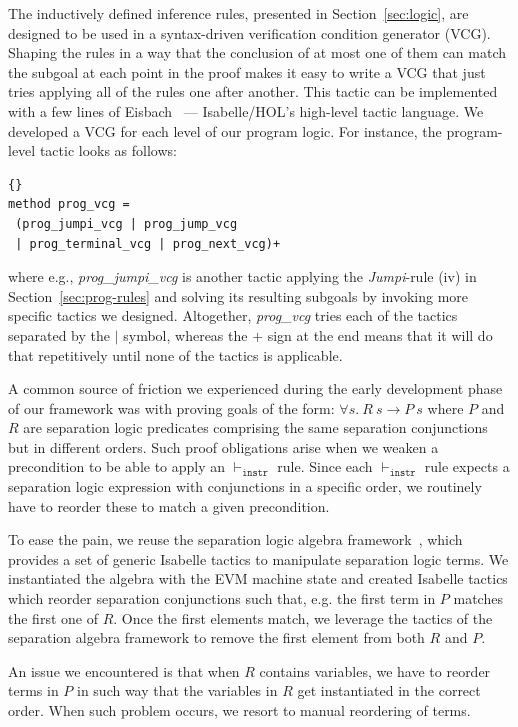 \documentclass[sigplan,10pt]{acmart}\settopmatter{printfolios=true,printccs=false,printacmref=false}
\begin{document}
The inductively defined inference rules, presented in Section~\ref{sec:logic},
are designed to be used in a syntax-driven verification
condition generator (VCG).
Shaping the rules in a way that the conclusion of at most one of them
can match the subgoal at each point in the
proof makes it easy to write a VCG that just tries applying all of the rules
one after another.
This tactic can be implemented with a few lines of Eisbach~\cite{Matichuk_MW_16} ---
Isabelle/HOL's high-level tactic language.
We developed a VCG for each level of our program logic.
For instance, the program-level tactic looks as follows:
\begin{lstlisting}[language=Isar]{}
method prog_vcg =
 (prog_jumpi_vcg | prog_jump_vcg
 | prog_terminal_vcg | prog_next_vcg)+
\end{lstlisting}
where e.g., \textit{prog\_jumpi\_vcg} is another tactic applying the \textit{Jumpi}-rule (iv) 
in Section~\ref{sec:prog-rules} and solving its resulting subgoals by
invoking more specific tactics we designed.
Altogether, \textit{prog\_vcg} tries each of the tactics separated by the $|$ symbol,
whereas the $+$ sign at the end means that it will do that repetitively until
none of the tactics is applicable. 

A common source of friction we experienced during the early development phase
of our framework was with proving goals of the form:
$\forall s.\: R\:s \longrightarrow P\:s$ where $P$ and $R$ are separation logic predicates
comprising the same separation conjunctions but in different orders.
Such proof obligations arise when we weaken a precondition to be
able to apply an $\vdash_\mathtt{instr}$ rule.
Since each $\vdash_\mathtt{instr}$ rule expects a separation logic expression with conjunctions
in a specific order, we routinely have to reorder these to
match a given precondition.

To ease the pain, we reuse the separation logic algebra framework~\cite{Klein_KB_12},
which provides a set of generic Isabelle tactics to manipulate separation logic terms.
We instantiated the algebra with the EVM machine state and created Isabelle tactics
which reorder separation conjunctions such that, e.g. %
the first term in $P$ matches the first one of $R$.
Once the first elements match, we leverage the tactics of the separation
algebra framework to remove the first element from both $R$ and $P$.

An issue we encountered is that when $R$ contains variables,
we have to reorder terms in $P$ in such way that the variables in $R$ get instantiated
in the correct order.
When such problem occurs, we resort to manual reordering of terms. %
%
\end{document}
